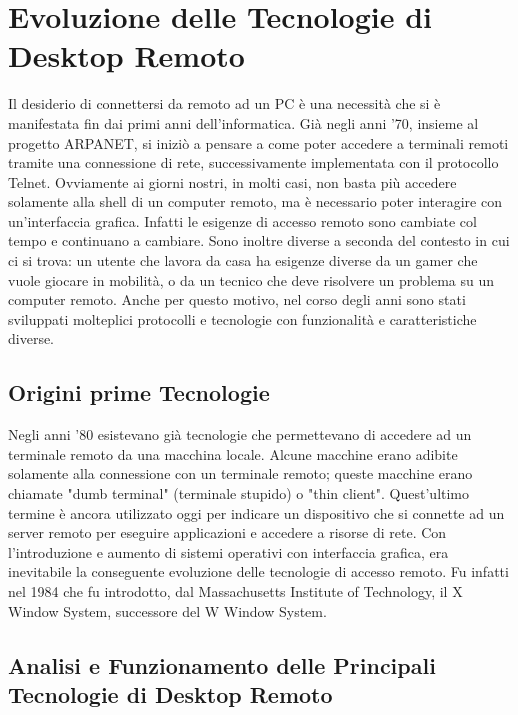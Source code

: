 \documentclass[12pt,a4paper,openright,twoside]{book}
\begin{document}

\chapter{Evoluzione delle Tecnologie di Desktop Remoto}
\label{chap:evolution}
Il desiderio di connettersi da remoto ad un \ac{PC} è una necessità che si è manifestata fin dai primi anni dell'informatica.
Già negli anni '70,
insieme al progetto ARPANET, si iniziò a pensare a come poter accedere a terminali remoti tramite una connessione di rete,
successivamente implementata con il protocollo Telnet.
Ovviamente ai giorni nostri, in molti casi, non basta più accedere solamente alla shell di un computer remoto,
ma è necessario poter interagire con un'interfaccia grafica.
%
Infatti le esigenze di accesso remoto sono cambiate col tempo e continuano a cambiare.
Sono inoltre diverse a seconda del contesto in cui ci si trova:
un utente che lavora da casa ha esigenze diverse da un gamer che vuole giocare in mobilità,
o da un tecnico che deve risolvere un problema su un computer remoto.
Anche per questo motivo, nel corso degli anni sono stati sviluppati molteplici protocolli e tecnologie con funzionalità e caratteristiche diverse.

\section{Origini prime Tecnologie}
Negli anni '80 esistevano già tecnologie che permettevano di accedere ad un terminale remoto da una macchina locale.
Alcune macchine erano adibite solamente alla connessione con un terminale remoto;
queste macchine erano chiamate "dumb terminal" (terminale stupido) o "thin client".
%
Quest'ultimo termine è ancora utilizzato oggi per indicare un dispositivo che si connette ad un server remoto per eseguire applicazioni e accedere a risorse di rete.
Con l'introduzione e aumento di sistemi operativi con interfaccia grafica, era inevitabile la conseguente evoluzione delle tecnologie di accesso remoto.
%
Fu infatti nel 1984 che fu introdotto, dal Massachusetts Institute of Technology, il X Window System, successore del W Window System.

\section{Analisi e Funzionamento delle Principali Tecnologie di Desktop Remoto} 
\end{document}
